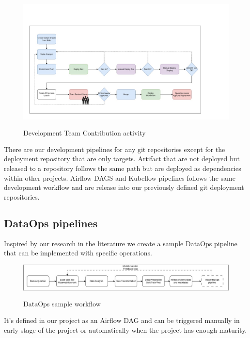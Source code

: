 \begin{figure}[!htbp]
    \centering
    \caption{Development Team Contribution activity}
    \includegraphics[scale=0.3]{images/project/cicd-workflow-p2}
    \label{fig:cd-workflow-p2}
\end{figure}

There are our development pipelines for any git repositories except for the deployment repository that are only targets.
Artifact that are not deployed but released to a repository follows the same path but are deployed as dependencies within other projects.
Airflow DAGS and Kubeflow pipelines follows the same development workflow and are release into our previously defined git deployment repositories.


\subsection{DataOps pipelines}\label{subsec:dataops-pipelines}
Inspired by our research in the literature we create a sample DataOps pipeline that can be implemented with specific
operations.

\begin{figure}[!htbp]
    \centering
    \caption{DataOps sample workflow}
    \includegraphics[scale=0.3]{images/project/dataops-workflow}
    \label{fig:project-dataops-workflow}
\end{figure}

It's defined in our project as an Airflow DAG and can be triggered manually in early stage of the project or
automatically when the project has enough maturity.

